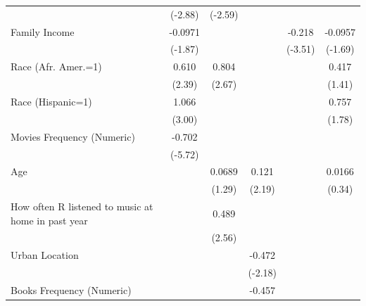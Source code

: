 {\begin{longtable}{l*{5}{c}}
                    &     (-2.88)       &     (-2.59)       &                   &                   &                   \\
Family Income       &     -0.0971\sym{*}&                   &                   &      -0.218\sym{*}&     -0.0957\sym{*}\\
                    &     (-1.87)       &                   &                   &     (-3.51)       &     (-1.69)       \\
Race (Afr. Amer.=1) &       0.610\sym{*}&       0.804\sym{*}&                   &                   &       0.417       \\
                    &      (2.39)       &      (2.67)       &                   &                   &      (1.41)       \\
Race (Hispanic=1)   &       1.066\sym{*}&                   &                   &                   &       0.757\sym{*}\\
                    &      (3.00)       &                   &                   &                   &      (1.78)       \\
Movies Frequency (Numeric)&      -0.702\sym{*}&                   &                   &                   &                   \\
                    &     (-5.72)       &                   &                   &                   &                   \\
Age                 &                   &      0.0689       &       0.121\sym{*}&                   &      0.0166       \\
                    &                   &      (1.29)       &      (2.19)       &                   &      (0.34)       \\
How often R listened to music at home in past year&                   &       0.489\sym{*}&                   &                   &                   \\
                    &                   &      (2.56)       &                   &                   &                   \\
Urban Location      &                   &                   &      -0.472\sym{*}&                   &                   \\
                    &                   &                   &     (-2.18)       &                   &                   \\
Books Frequency (Numeric)&                   &                   &      -0.457\sym{*}&                   &                   \\

\end{longtable}}
